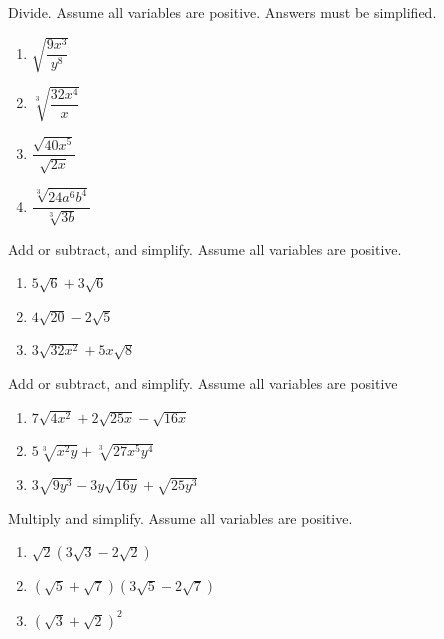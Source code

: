 \documentclass[
  en,11pt]{elegantbook}
\let\BeginKnitrBlock\begin \let\EndKnitrBlock\end
\begin{document}
\BeginKnitrBlock{exercise}
\protect\hypertarget{exr:unnamed-chunk-98}{}{\label{exr:unnamed-chunk-98} }
Divide. Assume all variables are positive. Answers must be simplified.

\begin{enumerate}
\def\labelenumi{\arabic{enumi}.}

\item
  \(\sqrt{\dfrac{9x^3}{y^8}}\)
\item
  \(\sqrt[3]{\dfrac{32x^4}{x}}\)
\item
  \(\dfrac{\sqrt{40x^5}}{\sqrt{2x}}\)
\item
  \(\dfrac{\sqrt[3]{24a^6b^4}}{\sqrt[3]{3b}}\)
\end{enumerate}
\EndKnitrBlock{exercise}

\BeginKnitrBlock{exercise}
\protect\hypertarget{exr:unnamed-chunk-99}{}{\label{exr:unnamed-chunk-99} }
Add or subtract, and simplify. Assume all variables are positive.

\begin{enumerate}
\def\labelenumi{\arabic{enumi}.}

\item
  \(5\sqrt6+3\sqrt6\)
\item
  \(4\sqrt{20}-2\sqrt5\)
\item
  \(3\sqrt{32x^2}+5x\sqrt{8}\)
\end{enumerate}
\EndKnitrBlock{exercise}

\BeginKnitrBlock{exercise}
\protect\hypertarget{exr:unnamed-chunk-100}{}{\label{exr:unnamed-chunk-100} }
Add or subtract, and simplify. Assume all variables are positive

\begin{enumerate}
\def\labelenumi{\arabic{enumi}.}

\item
  \(7\sqrt{4x^2}+2\sqrt{25x}-\sqrt{16x}\)
\item
  \(5\sqrt[3]{x^2y}+\sqrt[3]{27x^5y^4}\)
\item
  \(3\sqrt{9y^3}-3y\sqrt{16y}+\sqrt{25y^3}\)
\end{enumerate}
\EndKnitrBlock{exercise}

\BeginKnitrBlock{exercise}
\protect\hypertarget{exr:unnamed-chunk-101}{}{\label{exr:unnamed-chunk-101} }
Multiply and simplify. Assume all variables are positive.

\begin{enumerate}
\def\labelenumi{\arabic{enumi}.}

\item
  \(\sqrt2(3\sqrt3-2\sqrt2)\)
\item
  \((\sqrt5+\sqrt7)(3\sqrt5-2\sqrt7)\)
\item
  \((\sqrt3+\sqrt2)^2\)
\end{enumerate}
\EndKnitrBlock{exercise}
\end{document}
